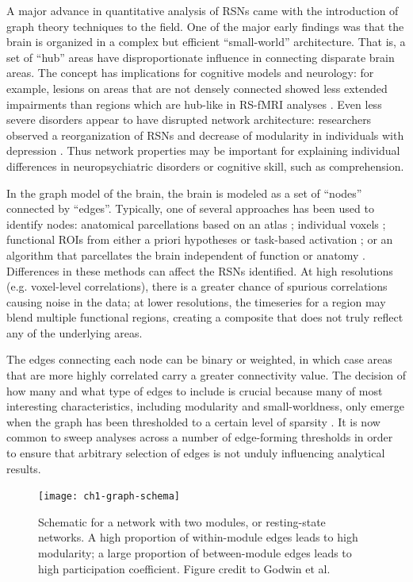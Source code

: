 A major advance in quantitative analysis of RSNs came with the introduction of graph theory techniques to the field. One of the major early findings was that the brain is organized in a complex but efficient ``small-world'' architecture. That is, a set of ``hub'' areas have disproportionate influence in connecting disparate brain areas. The concept has implications for cognitive models and neurology: for example, lesions on areas that are not densely connected showed less extended impairments than regions which are hub-like in RS-fMRI analyses \citep{Warren2014}. Even less severe disorders appear to have disrupted network architecture: researchers observed a reorganization of RSNs and decrease of modularity in individuals with depression \citep{Lord2012}. Thus network properties may be important for explaining individual differences in neuropsychiatric disorders or cognitive skill, such as comprehension.

In the graph model of the brain, the brain is modeled as a set of ``nodes'' connected by ``edges''. Typically, one of several approaches has been used to identify nodes: anatomical parcellations based on an atlas \citep{Supekar2008, Liu2008, Lynall2010}; individual voxels \citep{Fair2007}; functional ROIs from either a priori hypotheses or task-based activation \citep{VandenHeuvel2010}; or an algorithm that parcellates the brain independent of function or anatomy \citep{Goni2014}. Differences in these methods can affect the RSNs identified. At high resolutions (e.g. voxel-level correlations), there is a greater chance of spurious correlations causing noise in the data; at lower resolutions, the timeseries for a region may blend multiple functional regions, creating a composite that does not truly reflect any of the underlying areas. 

The edges connecting each node can be binary or weighted, in which case areas that are more highly correlated carry a greater connectivity value. The decision of how many and what type of edges to include is crucial because many of most interesting characteristics, including modularity and small-worldness, only emerge when the graph has been thresholded to a certain level of sparsity \citep{Moussa2012}. It is now common to sweep analyses across a number of edge-forming thresholds in order to ensure that arbitrary selection of edges is not unduly influencing analytical results.

\begin{figure}[t]
    \centering
    \texttt{[image: ch1-graph-schema]}
    \caption[Schematic for a network with two modules.]{Schematic for a network with two modules, or resting-state networks. A high proportion of within-module edges leads to high modularity; a large proportion of between-module edges leads to high participation coefficient. Figure credit to Godwin et al. \citep{Godwin2016}}
    \label{fig:ch1-graph-schema}
\end{figure}

